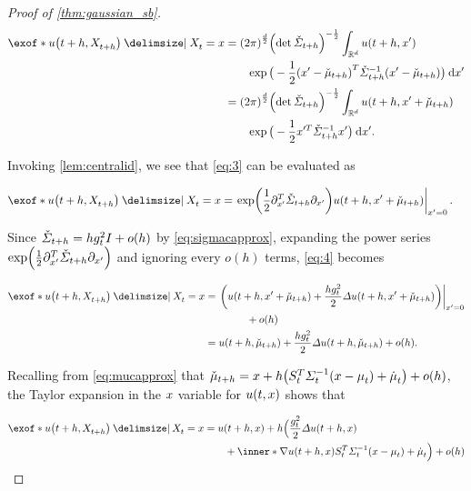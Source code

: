 \begin{proof}[Proof of \cref{thm:gaussian_sb}]
\begin{align}
\nn
\exof*{ \testf[\ctime+h][\Xsol[\ctime+h]] \given \Xsol = \point  } &=  \Nconst  \parens*{\det \Sigmac}^{-\frac{1}{2}} \intR \testf[\ctime+h][\pointalt] \\
&\qquad \exp\big( -\frac{1}{2} \parens*{\pointalt - \muc}^T  \Sigmacinv\parens*{\pointalt - \muc}\big) \dd \pointalt \\
\nn
&= \Nconst\parens*{\det \Sigmac}^{-\frac{1}{2}} \intR \testf[\ctime+h][\pointalt + \muc]  \\
\label{eq:3}
&\qquad  \exp\big( -\frac{1}{2} \pointalt^T  \Sigmacinv\pointalt \big) \dd \pointalt.
\end{align}

Invoking \cref{lem:centralid}, we see that \eqref{eq:3} can be evaluated as

\begin{align}
\label{eq:4}
\exof*{ \testf[\ctime+h][\Xsol[\ctime+h]] \given \Xsol = \point  } &=  \left.\exp\parens*{ \frac{1}{2} \del_{\pointalt}^T  \Sigmac \del_{\pointalt}}  \testf[\ctime+h][\pointalt + \muc]\right\vert_{\pointalt = 0}.
\end{align}

Since $\Sigmac = h\volatsq[\ctime]\eye + o(h) $ by \eqref{eq:sigmacapprox}, expanding the power series $\exp\parens*{ \frac{1}{2} \del_{\pointalt}^T  \Sigmac \del_{\pointalt}} $ and ignoring every $o(h)$ terms, \eqref{eq:4} becomes

\begin{align}
\nn
\exof*{ \testf[\ctime+h][\Xsol[\ctime+h]] \given \Xsol = \point  } &=  \left. \parens*{\testf[\ctime+h][\pointalt + \muc] + \frac{h\volatsq[\ctime]}{2}\Laplace \testf[\ctime+h][\pointalt + \muc]}\right\vert_{\pointalt = 0}  \\
\nn
&\qquad\qquad+ o(h) \\
\label{eq:5}
&= \testf[\ctime+h][ \muc] + \frac{h\volatsq[\ctime]}{2}\Laplace \testf[\ctime+h][ \muc] + o(h).
\end{align}

Recalling from \eqref{eq:mucapprox} that $\muc = \point + h \parens*{  \St^T  \Sigmasolinv\parens*{ \point - \meansol  } + \dmeansol } + o(h)$, the Taylor expansion in the $\point$ variable for $\testf$ shows that 

\begin{align}
\nn
\exof*{ \testf[\ctime+h][\Xsol[\ctime+h]] \given \Xsol = \point  } &= \testf[\ctime+h][\point] + h\Big( \frac{\volatsq[\ctime]}{2}\Laplace \testf[\ctime+h][ \point] \\
	&\qquad + \inner*{ \nabla \testf[\ctime+h][\point]}{ \St^T  \Sigmasolinv\parens*{ \point - \meansol  } + \dmeansol } \Big) + o(h)
\end{align}


\end{proof}
